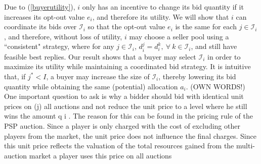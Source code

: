 \documentclass[12pt]{article}
\theoremstyle{definition}
\newcommand{\mcI}{\mathcal{I}}
\begin{document}
\begin{multicols}{2}
Due to (\ref{buyerutility}), $i$ only has an incentive to change its bid
quantity if it increases its opt-out value $e_i$, and therefore its utility. 
We will show that $i$ can coordinate its
bids over $\mcI_i$ so that the opt-out value $e_i$ is the same for each
$j \in\mcI_i$, and therefore, without loss of utility, $i$ may choose a seller pool 
using a ``consistent" strategy, where for any $j\in \mcI_i$, $d_i^j = d_i^k, \
\forall \ k \in \mcI_i$, and still have feasible best replies. 
Our result shows that a buyer may select $\mcI_i$ in order to maximize its
utility while maintaining a coordinated bid strategy. 
It is intuitive that, if $j^*
< I$, a buyer may increase the size of $\mcI_i$, thereby lowering its bid
quantity while obtaining the same (potential) allocation $a_i$. 
(OWN WORDS!)
One important question to ask is why a bidder should bid with identical unit
prices on (j) all auctions and not reduce the unit price to a level where he still wins the
amount q i . The reason for this can be found in the pricing rule of the PSP auction. Since a
player is only charged with the cost of excluding other players from the market, the
unit price does not influence the final charges. Since this unit price reflects the
valuation of the total resources gained from the multi-auction market a player uses this price on all
auctions


\end{multicols}
\end{document}
